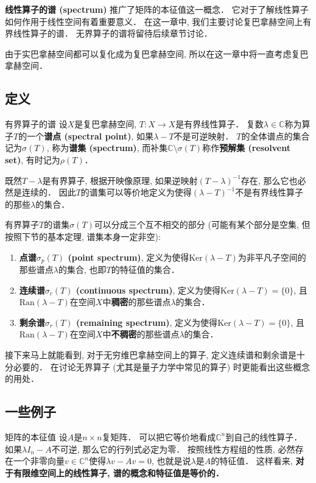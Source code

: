 
\textbf{线性算子的谱 (spectrum)} 推广了矩阵的本征值这一概念． 它对于了解线性算子如何作用于线性空间有着重要意义． 在这一章中, 我们主要讨论复巴拿赫空间上有界线性算子的谱． 无界算子的谱将留待后续章节讨论．

由于实巴拿赫空间都可以复化成为复巴拿赫空间, 所以在这一章中将一直考虑复巴拿赫空间．

\subsection{定义}
\begin{definition}{有界算子的谱}
设$X$是复巴拿赫空间, $T:X\to X$是有界线性算子． 复数$\lambda\in\mathbb{C}$称为算子$T$的一个\textbf{谱点 (spectral point)}, 如果$\lambda-T$不是可逆映射． $T$的全体谱点的集合记为$\sigma(T)$, 称为\textbf{谱集 (spectrum)}, 而补集$\mathbb{C}\setminus\sigma(T)$称作\textbf{预解集 (resolvent set)}, 有时记为$\rho(T)$．
\end{definition}

既然$T-\lambda$是有界算子, 根据开映像原理, 如果逆映射$(T-\lambda)^{-1}$存在, 那么它也必然是连续的． 因此$T$的谱集可以等价地定义为使得$(\lambda-T)^{-1}$不是有界线性算子的那些$\lambda$的集合．

有界算子$T$的谱集$\sigma(T)$可以分成三个互不相交的部分 (可能有某个部分是空集, 但按照下节的基本定理, 谱集本身一定非空):

\begin{enumerate}
\item \textbf{点谱$\sigma_p(T)$ (point spectrum)}, 定义为使得$\text{Ker}(\lambda-T)$为非平凡子空间的那些谱点$\lambda$的集合, 也即$T$的特征值的集合．

\item \textbf{连续谱$\sigma_c(T)$ (continuous spectrum)}, 定义为使得$\text{Ker}(\lambda-T)=\{0\}$, 且$\text{Ran}(\lambda-T)$在空间$X$中\textbf{稠密}的那些谱点$\lambda$的集合．

\item \textbf{剩余谱$\sigma_r(T)$ (remaining spectrum)}, 定义为使得$\text{Ker}(\lambda-T)=\{0\}$, 且$\text{Ran}(\lambda-T)$在空间$X$中\textbf{不稠密}的那些谱点$\lambda$的集合．
\end{enumerate}

接下来马上就能看到, 对于无穷维巴拿赫空间上的算子, 定义连续谱和剩余谱是十分必要的． 在讨论无界算子 (尤其是量子力学中常见的算子) 时更能看出这些概念的用处．

\subsection{一些例子}
\begin{example}{矩阵的本征值}
设$A$是$n\times n$复矩阵． 可以把它等价地看成$\mathbb{C}^n$到自己的线性算子． 如果$\lambda I_n-A$不可逆, 那么它的行列式必定为零． 按照线性方程组的性质, 必然存在一个非零向量$v\in \mathbb{C}^n$使得$\lambda v-Av=0$, 也就是说$\lambda$是$A$的特征值． 这样看来, \textbf{对于有限维空间上的线性算子, 谱的概念和特征值是等价的．}
\end{example}

